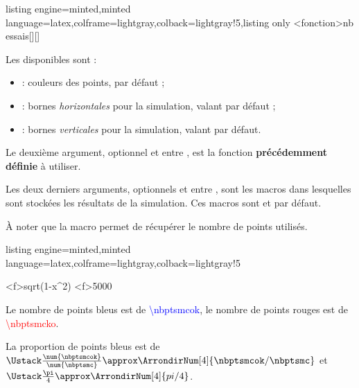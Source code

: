 \documentclass[11pt,a4paper]{ltxdoc}
\begin{document}
\begin{tcblisting}{listing engine=minted,minted language=latex,colframe=lightgray,colback=lightgray!5,listing only}
\SimulerMonteCarlo[clés]<fonction>{nb essais}[\nbptsmcok][\nbptsmcko]
\end{tcblisting}

Les  disponibles sont :

\begin{itemize}
	\item {} : couleurs des points,  par défaut ;
	\item {} : bornes \textit{horizontales} pour la simulation, valant  par défaut ;
	\item {} : bornes \textit{verticales} pour la simulation, valant  par défaut.
\end{itemize}

Le deuxième argument, optionnel et entre , est la fonction \textbf{précédemment définie} à utiliser.

\smallskip

Les deux derniers arguments, optionnels et entre \MontreCode{[...]}, sont les macros dans lesquelles sont stockées les résultats de la simulation. Ces macros sont  et  par défaut.

À noter que la macro  permet de récupérer le nombre de points utilisés.

\begin{tcblisting}{listing engine=minted,minted language=latex,colframe=lightgray,colback=lightgray!5}

\begin{GraphiqueTikz}%
	[x=10cm,y=10cm,Xmin=0,Xmax=1,Xgrille=0.1,Xgrilles=0.05,
	Ymin=0,Ymax=1,Ygrille=0.1,Ygrilles=0.05]
	{sqrt(1-x^2)}
	{5000}
\end{GraphiqueTikz}

Le nombre de points bleus est de \textcolor{blue}{\num{\nbptsmcok}},
le nombre de points rouges est de \textcolor{red}{\num{\nbptsmcko}}.

La proportion de points bleus est de $\frac{\num{\nbptsmcok}}{\num{\nbptsmc}}
\approx \ArrondirNum[4]{\nbptsmcok/\nbptsmc}$
et $\frac{\pi}{4} \approx \ArrondirNum[4]{pi/4}$.
\end{tcblisting}
\end{document}
